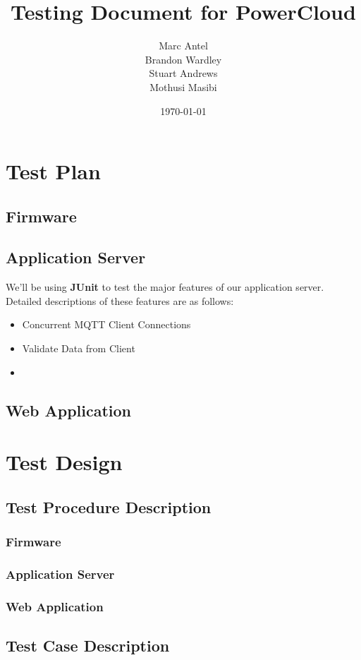 \documentclass[a4paper,10pt]{article}
\title{Testing Document for PowerCloud}
\author{Marc Antel\\ Brandon Wardley\\ Stuart Andrews\\ Mothusi Masibi}
\date{\today}
\begin{document}
	\maketitle
	\newpage
	\section{Test Plan}
		\subsection{Firmware}
		\subsection{Application Server}
			We'll be using \textbf{JUnit} to test the major features of our application server.
			Detailed descriptions of these features are as follows:
				\begin{itemize}
					\item Concurrent MQTT Client Connections
					\item Validate Data from Client
					\item 
				\end{itemize}
		\subsection{Web Application}
		
	\section{Test Design}
	\subsection{Test Procedure Description}
		\subsubsection{Firmware}
		\subsubsection{Application Server}
		\subsubsection{Web Application}
	
	\subsection{Test Case Description}
\end{document}
